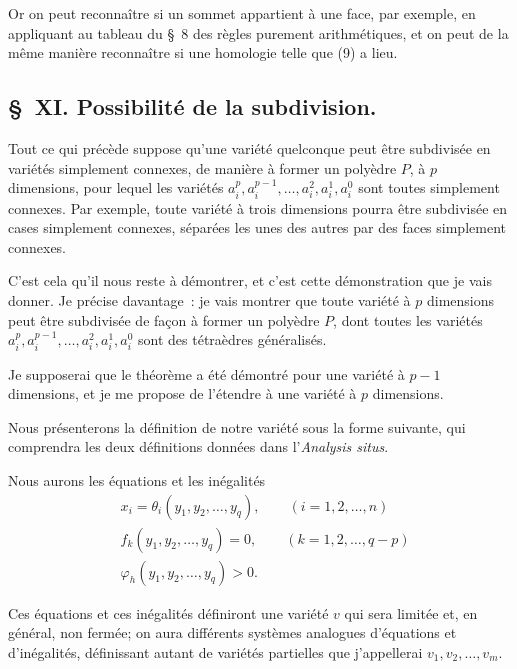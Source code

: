 \documentclass{article}
\begin{document}
Or on peut reconnaître si un sommet appartient à une face, par
exemple, en appliquant au tableau du \S~8 des règles purement arithmétiques, et on peut de la même manière reconnaître si une homologie telle que (9) a lieu.

\subsection*{\S~XI. Possibilité de la subdivision.}

Tout ce qui précède suppose qu'une variété quelconque peut être subdivisée en variétés simplement connexes, de manière à former un polyèdre $P$, à $p$ dimensions, pour lequel les variétés $a^{p}_{i}, a^{p-1}_{i}, \ldots, a^{2}_{i}, a^{1}_{i}, a^{0}_{i}$ sont toutes simplement connexes. Par exemple, toute variété à trois dimensions pourra être subdivisée en cases simplement connexes, séparées les unes des autres par des faces simplement connexes.

C'est cela qu'il nous reste à démontrer, et c'est cette démonstration que je vais donner. Je précise davantage~: je vais montrer que toute variété à $p$ dimensions peut être subdivisée de façon à former un polyèdre $P$, dont toutes les variétés $a^{p}_{i}, a^{p-1}_{i}, \ldots, a^{2}_{i}, a^{1}_{i}, a^{0}_{i}$ sont des tétraèdres généralisés.

Je supposerai que le théorème a été démontré pour une variété à $p - 1$ dimensions, et je me propose de l'étendre à une variété à $p$ dimensions.

Nous présenterons la définition de notre variété sous la forme suivante, qui comprendra les deux définitions données dans l'\emph{Analysis situs}.

Nous aurons les équations et les inégalités
\[ \begin{aligned} &x_{i} = \theta_{i}(y_{1}, y_{2}, \ldots, y_{q}), \qquad (i = 1, 2, \ldots, n)\\ &f_{k}(y_{1}, y_{2}, \ldots, y_{q}) = 0, \qquad (k = 1, 2, \ldots, q - p)\\ &\varphi_{h}(y_{1}, y_{2}, \ldots, y_{q}) > 0. \end{aligned} \tag{1} \]

Ces équations et ces inégalités définiront une variété $v$ qui sera limitée et, en général, non fermée; on aura différents systèmes analogues d'équations et d'inégalités, définissant autant de variétés partielles que j'appellerai $v_{1}, v_{2}, \ldots, v_{m}$.

\end{document}
